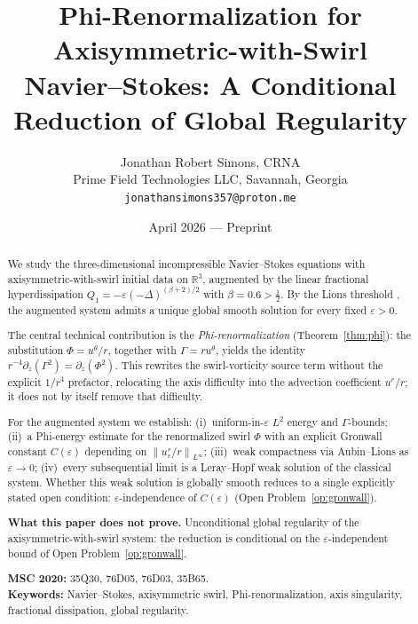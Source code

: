 \documentclass{article}
\title{Phi-Renormalization for Axisymmetric-with-Swirl\\
Navier--Stokes: A Conditional Reduction of Global Regularity}
\author{Jonathan Robert Simons, CRNA \\
Prime Field Technologies LLC, Savannah, Georgia \\
\texttt{jonathansimons357@proton.me}}
\date{April 2026 \quad --- \quad Preprint}
\theoremstyle{definition}
\theoremstyle{remark}
\newcommand{\R}{\mathbb{R}}
\newcommand{\e}{\varepsilon}
\newcommand{\norm}[1]{\left\|#1\right\|}
\begin{document}
\maketitle

\begin{abstract}
We study the three-dimensional incompressible Navier--Stokes equations
with axisymmetric-with-swirl initial data on $\R^3$, augmented by the
linear fractional hyperdissipation $Q_1 = -\e(-\Delta)^{(\beta+2)/2}$
with $\beta = 0.6 > \frac{1}{2}$.  By the Lions threshold \cite{Lions1969},
the augmented system admits a unique global smooth solution for every
fixed $\e > 0$.

The central technical contribution is the \emph{Phi-renormalization}
(Theorem~\ref{thm:phi}):  the substitution $\Phi = u^\theta/r$, together
with $\Gamma = r u^\theta$, yields the identity
$r^{-4}\partial_z(\Gamma^2) = \partial_z(\Phi^2)$.  This rewrites the
swirl-vorticity source term without the explicit $1/r^4$ prefactor,
relocating the axis difficulty into the advection coefficient $u^r/r$;
it does not by itself remove that difficulty.

For the augmented system we establish: (i)~uniform-in-$\e$ $L^2$
energy and $\Gamma$-bounds; (ii)~a Phi-energy estimate for the renormalized
swirl $\Phi$ with an explicit Gronwall constant $C(\e)$ depending on
$\norm{u^r_\e/r}_{L^\infty}$; (iii)~weak compactness via Aubin--Lions as
$\e\to 0$; (iv)~every subsequential limit is a Leray--Hopf weak solution
of the classical system.  Whether this weak solution is globally smooth
reduces to a single explicitly stated open condition:
$\e$-independence of $C(\e)$ (Open Problem~\ref{op:gronwall}).

\medskip\noindent
\textbf{What this paper does not prove.}\enspace
Unconditional global regularity of the axisymmetric-with-swirl system: the
reduction is conditional on the $\e$-independent bound of Open
Problem~\ref{op:gronwall}.

\medskip\noindent
\textbf{MSC 2020:} 35Q30, 76D05, 76D03, 35B65.\\
\textbf{Keywords:} Navier--Stokes, axisymmetric swirl,
Phi-renormalization, axis singularity, fractional dissipation,
global regularity.
\end{abstract}

\tableofcontents

\end{document}
